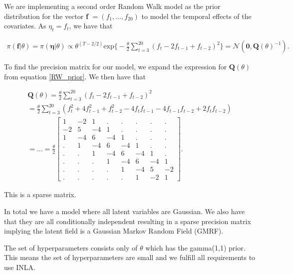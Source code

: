 We are implementing a second order Random Walk model as the prior distribution for the vector \textbf{f} $= (f_1,...,f_{20})$ to model the temporal effects of the covariates. As $\eta_t = f_t$, we have that 

\begin{align} \label{RW_prior}
    \pi(\mathbf{f}|\theta) = \pi(\mathbf{ \eta}|\theta) \propto
    \theta^{(T-2/2)} \text{exp} \Bigg\{  -\frac{\theta}{2} \sum_{t = 3}^{20} (f_t - 2f_{t-1} + f_{t-2})^2  \Bigg\} = \mathcal{N}(\mathbf{0}, \mathbf{Q}(\theta)^{-1}).
\end{align}


To find the precision matrix for our model, we expand the expression for $\textbf{Q}(\theta)$ from equation \ref{RW_prior}. We then have that 

\begin{align} \label{precision_mat}
    \textbf{Q}(\theta) =\frac{\theta}{2} \sum_{t = 3}^{20} (f_t - 2f_{t-1} + f_{t-2})^2 \nonumber \\
    = \frac{\theta}{2}\sum_{t = 3}^{20} (f_t^2 + 4f_{t-1}^2 + f_{t-2}^2 - 4f_t f_{t-1} - 4 f_{t-1} f_{t-2} + 2f_t f_{t-2}) \nonumber \\
    = ... = \frac{\theta}{2}
    \begin{bmatrix}
        1 & -2 & 1 & . & . & . & . & . \\
        -2 & 5 & -4 & 1 & . & . & . & .  \\
        1 & -4 & 6 & -4 & 1 & . & . &  . \\
        . & 1 & -4 & 6 & -4 & 1 & . & . \\
        . & . & 1 & -4 & 6 & -4 & 1 & . \\
        . & . & . & 1 & -4 & 6 & -4 & 1 \\
        . & . & . & . & 1& -4& 5 & -2 \\
        . & . & . & . & . & 1 & -2 & 1 
    \end{bmatrix}.
\end{align}

This is a sparse matrix. 

In total we have a model where all latent variables are Gaussian. We also have that they are all conditionally independent resulting in a sparse precision matrix implying the latent field is a Gaussian Markov Random Field (GMRF). 

The set of hyperparameters consists only of $\theta$ which has the gamma(1,1) prior. This means the set of hyperparameters are small and we fulfill all requirements to use INLA.

